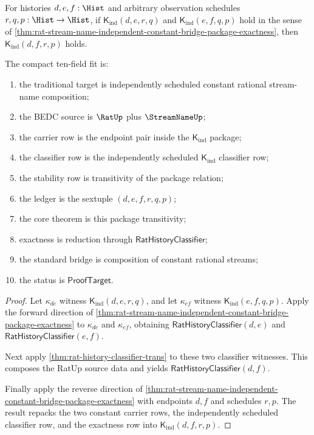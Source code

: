 \begin{theorem}
\label{thm:rat-stream-name-independent-constant-bridge-package-transitivity}
For histories $d,e,f:\Hist$ and arbitrary observation schedules
$r,q,p:\Hist\to\Hist$, if
$\mathsf{K}_{\mathrm{ind}}(d,e,r,q)$ and
$\mathsf{K}_{\mathrm{ind}}(e,f,q,p)$ hold in the sense of
\autoref{thm:rat-stream-name-independent-constant-bridge-package-exactness},
then $\mathsf{K}_{\mathrm{ind}}(d,f,r,p)$ holds.

The compact ten-field fit is:
\begin{enumerate}
  \item the traditional target is independently scheduled constant rational
  stream-name composition;
  \item the BEDC source is $\RatUp$ plus $\StreamNameUp$;
  \item the carrier row is the endpoint pair inside the
  $\mathsf{K}_{\mathrm{ind}}$ package;
  \item the classifier row is the independently scheduled
  $\mathsf{K}_{\mathrm{ind}}$ classifier row;
  \item the stability row is transitivity of the package relation;
  \item the ledger is the sextuple $(d,e,f,r,q,p)$;
  \item the core theorem is this package transitivity;
  \item exactness is reduction through $\mathsf{RatHistoryClassifier}$;
  \item the standard bridge is composition of constant rational streams;
  \item the status is $\mathsf{ProofTarget}$.
\end{enumerate}
\end{theorem}
\begin{proof}
Let $\kappa_{de}$ witness
$\mathsf{K}_{\mathrm{ind}}(d,e,r,q)$, and let $\kappa_{ef}$ witness
$\mathsf{K}_{\mathrm{ind}}(e,f,q,p)$. Apply the forward direction of
\autoref{thm:rat-stream-name-independent-constant-bridge-package-exactness}
to $\kappa_{de}$ and $\kappa_{ef}$, obtaining
$\mathsf{RatHistoryClassifier}(d,e)$ and
$\mathsf{RatHistoryClassifier}(e,f)$.

Next apply
\autoref{thm:rat-history-classifier-trans} to these two classifier witnesses.
This composes the RatUp source data and yields
$\mathsf{RatHistoryClassifier}(d,f)$.

Finally apply the reverse direction of
\autoref{thm:rat-stream-name-independent-constant-bridge-package-exactness}
with endpoints $d,f$ and schedules $r,p$. The result repacks the two constant
carrier rows, the independently scheduled classifier row, and the exactness row
into $\mathsf{K}_{\mathrm{ind}}(d,f,r,p)$.
\end{proof}

